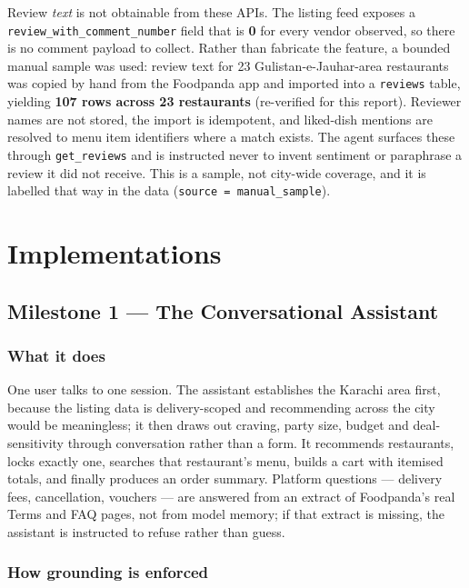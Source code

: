 \documentclass[11pt,a4paper]{article}
\newcommand{\code}[1]{\texttt{\small #1}}
\begin{document}
Review \emph{text} is not obtainable from these APIs. The listing feed exposes
a \code{review\_with\_\allowbreak comment\_number} field that is \textbf{0} for every
vendor observed, so there is no comment payload to collect. Rather than
fabricate the feature, a bounded manual sample was used: review text for 23
Gulistan-e-Jauhar-area restaurants was copied by hand from the Foodpanda app
and imported into a \code{reviews} table, yielding \textbf{107 rows across 23
restaurants} (re-verified for this report). Reviewer names are not stored, the
import is idempotent, and liked-dish mentions are resolved to menu item
identifiers where a match exists. The agent surfaces these through
\code{get\_reviews} and is instructed never to invent sentiment or paraphrase a
review it did not receive. This is a sample, not city-wide coverage, and it is
labelled that way in the data (\code{source = manual\_sample}).

\section{Implementations}

\subsection{Milestone 1 --- The Conversational Assistant}

\subsubsection*{What it does}

One user talks to one session. The assistant establishes the Karachi area
first, because the listing data is delivery-scoped and recommending across the
city would be meaningless; it then draws out craving, party size, budget and
deal-sensitivity through conversation rather than a form. It recommends
restaurants, locks exactly one, searches that restaurant's menu, builds a cart
with itemised totals, and finally produces an order summary. Platform
questions --- delivery fees, cancellation, vouchers --- are answered from an
extract of Foodpanda's real Terms and FAQ pages, not from model memory; if
that extract is missing, the assistant is instructed to refuse rather than
guess.

\subsubsection*{How grounding is enforced}
\end{document}
